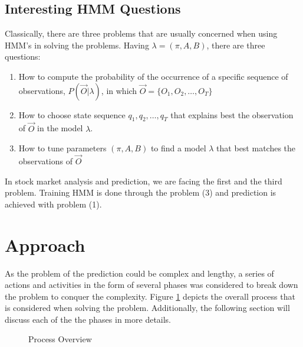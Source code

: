 \documentclass{acm_proc_article-sp}
\begin{document}
\subsection{Interesting HMM Questions} \label{sec:hmm_probs}
Classically, there are three problems that are usually concerned when using HMM's in solving the problems. Having
$\lambda = (\pi, A, B)$, there are three questions:
\begin{enumerate}
  \item How to compute the probability of the occurrence of a specific sequence of observations, $P(\vec{O}|\lambda)$,
  in which $\vec{O} = \{O_1, O_2, \ldots, O_T\}$
  \item How to choose state sequence $q_1, q_2, \ldots, q_T$ that explains best the observation of $\vec{O}$ in the
  model $\lambda$.
  \item How to tune parameters $(\pi, A, B)$ to find a model $\lambda$ that best matches the observations of $\vec{O}$
\end{enumerate}

In stock market analysis and prediction, we are facing the first and the third problem. Training HMM is done through
the problem (3) and prediction is achieved with problem (1).

\section{Approach} \label{sec:approach}
As the problem of the prediction could be complex and lengthy, a series of actions and activities in the form of
several phases was considered to break down the problem to conquer the complexity. Figure \ref{fig:appoverview} 
depicts the overall process that is considered when solving the problem. Additionally, the following section will 
discuss each of the the phases in more details.

\begin{figure}[h] 
\centering
\setlength\fboxsep{0.1pt}
\setlength\fboxrule{0.7pt}
\caption{Process Overview} \label{fig:appoverview}
\end{figure}
\end{document}
